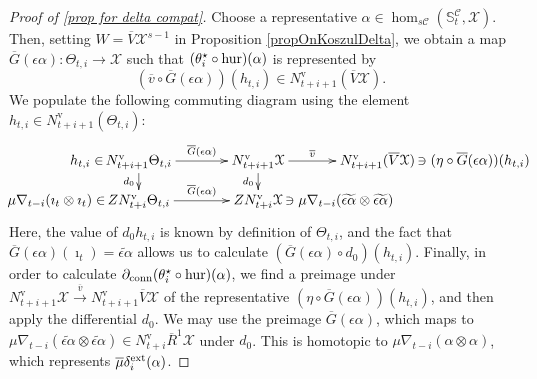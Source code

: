 \documentclass[11pt]{amsart} \renewcommand{\baselinestretch}{1.4}
\theoremstyle{plain}
\theoremstyle{definition}
\renewcommand{\to}{\longrightarrow}
\newcommand{\calx}{\mathcal{X}}
\newcommand{\calc}{\mathcal{C}}
\newcommand{\Nabla}{\nabla}
\newcommand{\uver}{^\mathrm{v}}
\newcommand{\Dendo}{R}
\begin{document}
\begin{Operations on the Bousfield-Kan spectral sequence}
\begin{proof}[Proof of \ref{prop for delta compat}]
Choose a representative $\alpha\in\hom_{s\calc}(\mathbb{S}^\calc_t, \calx )$. Then, setting $W=\overline{V}\calx^{s-1}$ in Proposition \ref{propOnKoszulDelta}, we obtain a map $\overline{G}(\epsilon\alpha):\Theta_{t,i}\to \calx $ such that $(\theta_i^\star\circ\textup{hur})(\alpha)$ is represented by
\[(\overline{v}\circ \overline{G}(\epsilon\alpha))(h_{t,i})
\in N\uver_{t+i+1}(\overline{V}\calx).\]
We populate the following commuting diagram using the element $h_{t,i}\in N\uver_{t+i+1}(\Theta_{t,i})$:
%
\[\xymatrix@R=10mm@C=30mm@!0{
\makebox[0cm][r]{$h_{t,i}\in\,$}N\uver_{t+i+1}\Theta_{t,i}\ar[d]_-{d_0}\ar[r]^-{\overline{G}(\epsilon\alpha)}&%
N\uver_{t+i+1}\calx \ar[d]_-{d_0}
\ar[r]^-{\overline{v}}
&%
N\uver_{t+i+1}(\overline{V}\calx)
\makebox[0cm][l]{$\,\ni (\eta\circ \overline{G}(\epsilon\alpha))(h_{t,i})$}
\\%
\makebox[0cm][r]{$\mu\Nabla_{t-i}(\imath_t\otimes \imath_t)\in\,$}ZN\uver_{t+i}\Theta_{t,i}\ar[r]^-{\overline{G}(\epsilon\alpha)}
&%
ZN\uver_{t+i}\calx \makebox[0cm][l]{$\,\ni\mu\Nabla_{t-i}(\widetilde{\epsilon\alpha}\otimes \widetilde{\epsilon\alpha})$}
&%
}\]
Here, the value of $d_0h_{t,i}$ is known by definition of $\Theta_{t,i}$, 
and the fact that $\overline{G}(\epsilon\alpha)(\imath_t)=\widetilde{\epsilon\alpha}$ allows us to calculate $(\overline{G}(\epsilon\alpha)\circ d_0)(h_{t,i})$. Finally, in order to calculate $\partial_\textup{conn}(\theta_i^\star\circ\textup{hur})(\alpha)$, we find a preimage under $N\uver_{t+i+1}\calx \overset{\overline{v}}{\to}N\uver_{t+i+1}\overline{V}\calx$ of the representative $(\eta\circ \overline{G}(\epsilon\alpha))(h_{t,i})$, and then apply the differential $d_0$. We may use the preimage $\overline{G}(\epsilon\alpha)$, which maps to $\mu\Nabla_{t-i}(\widetilde{\epsilon\alpha}\otimes \widetilde{\epsilon\alpha})\in N\uver_{t+i}\overline{\Dendo}^1\calx $ under $d_0$. This is homotopic to $\mu\Nabla_{t-i}(\alpha\otimes \alpha)$, which represents $\overline{\mu}\delta^\textup{ext}_i(\alpha)$.
\end{proof}

\end{Operations on the Bousfield-Kan spectral sequence}
\end{document}
